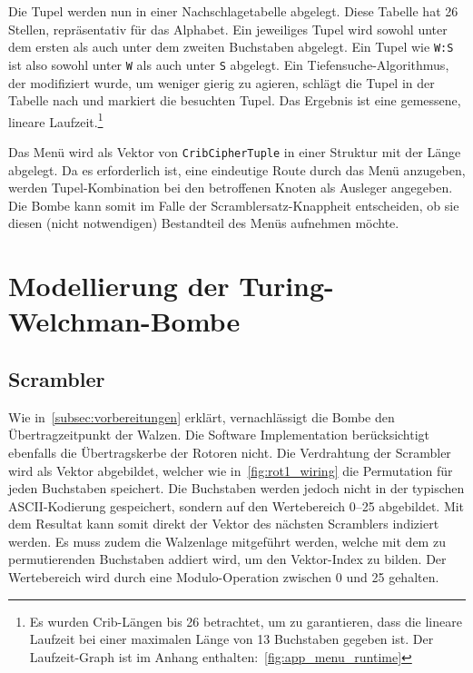 \noindent

Die Tupel werden nun in einer \glqq Nachschlagetabelle\grqq{} abgelegt.
Diese Tabelle hat 26 Stellen, repräsentativ für das Alphabet.
Ein jeweiliges Tupel wird sowohl unter dem ersten als auch unter dem zweiten Buchstaben abgelegt. 
Ein Tupel wie \texttt{W:S} ist also sowohl unter \texttt{W} als auch unter \texttt{S} abgelegt.
Ein Tiefensuche-Algorithmus, der modifiziert wurde, um weniger \glqq gierig\grqq{} zu agieren, schlägt die Tupel in der Tabelle nach und markiert die besuchten Tupel.
Das Ergebnis ist eine gemessene, lineare Laufzeit.\footnote{Es wurden Crib-Längen bis 26 betrachtet, um zu garantieren, dass die lineare Laufzeit bei einer maximalen Länge von 13 Buchstaben gegeben ist.
Der Laufzeit-Graph ist im Anhang enthalten:~\cref{fig:app_menu_runtime}}

Das Menü wird als Vektor von \texttt{CribCipherTuple} in einer Struktur mit der Länge abgelegt.
Da es erforderlich ist, eine eindeutige \glqq Route\grqq{} durch das Menü anzugeben, werden Tupel-Kombination bei den betroffenen Knoten als Ausleger angegeben. 
Die Bombe kann somit im Falle der \glqq Scramblersatz-Knappheit\grqq{} entscheiden, ob sie diesen (nicht notwendigen) Bestandteil des Menüs aufnehmen möchte.

\section{Modellierung der Turing-Welchman-Bombe}\label{sec:model}
\subsection{Scrambler}\label{subsec:impl_scrambler}
Wie in~\cref{subsec:vorbereitungen} erklärt, vernachlässigt die Bombe den Übertragzeitpunkt der Walzen.
Die Software Implementation berücksichtigt ebenfalls die Übertragskerbe der Rotoren nicht.
Die Verdrahtung der Scrambler wird als Vektor abgebildet, welcher wie in~\cref{fig:rot1_wiring} die Permutation für jeden Buchstaben speichert.
Die Buchstaben werden jedoch nicht in der typischen ASCII-Kodierung gespeichert, sondern auf den Wertebereich 0--25 abgebildet.
Mit dem Resultat kann somit direkt der Vektor des nächsten Scramblers indiziert werden.
Es muss zudem die Walzenlage mitgeführt werden, welche mit dem zu permutierenden Buchstaben addiert wird, um den Vektor-Index zu bilden.
Der Wertebereich wird durch eine Modulo-Operation zwischen 0 und 25 gehalten.

